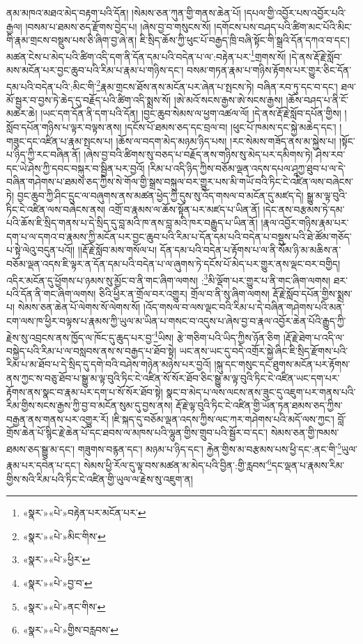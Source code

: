 ནམ་མཁའ་མཐའ་མེད་བརྟག་པའི་དོན། །སེམས་ཅན་ཀུན་གྱི་གནས་ཆེན་པོ། །དཔལ་གྱི་འབྱོར་པས་འབྱོར་པའི་རྒྱལ། །བསམ་པ་ཐམས་ཅད་རྫོགས་བྱེད་པ། །ཞེས་བྱ་བ་གསུངས་སོ། །དགོངས་པས་བཤད་པའི་ཚིག་མང་པོའི་མིང་གི་རྣམ་གྲངས་བསྡུས་པས་ཅི་ཞིག་བྱ་ཞེ་ན། ཇི་སྲིད་ཆོས་ཀྱི་ཕུང་པོ་བརྒྱད་ཁྲི་བཞི་སྟོང་གི་སྒྲའི་དོན་དཀའ་བ་དང་། མཚན་ངེས་པ་མེད་པའི་ཚིག་འདི་དག་ནི་དོན་དམ་པའི་བདེན་པ་ལ་:བརྟེན་པར་\footnote{«སྣར་»«པེ་»བརྟེན་པར་མངོན་པར་}གྲགས་སོ། །དེ་ནས་རྡོ་རྗེ་སློབ་མས་མངོན་པར་བྱང་ཆུབ་པའི་རིམ་པ་རྣམ་པ་གཉིས་དང་། བསམ་གཏན་རྣམ་པ་གཉིས་རྟོགས་པར་གྱུར་ཅིང་དོན་དམ་པའི་བདེན་པའི་:མིང་གི་\footnote{«སྣར་»«པེ་»མིང་གིས་}རྣམ་གྲངས་ཐོས་ནས་མངོན་པར་ཞེན་པ་སྤངས་ཏེ། བཞིན་རབ་ཏུ་དང་བ་དང་། ཐལ་མོ་སྦྱར་བ་བྱས་ཏེ་ཆེད་དུ་བརྗོད་པའི་ཚིག་འདི་སྨྲས་སོ། །ཨེ་མའོ་སངས་རྒྱས་ཨེ་སངས་རྒྱས། །ཆོས་བཤད་པ་ནི་ངོ་མཚར་ཆེ། །ཡང་དག་དོན་ནི་དག་པའི་དོན། །བྱང་ཆུབ་སེམས་ལ་ཕྱག་འཚལ་ལོ། །དེ་ནས་རྡོ་རྗེ་སློབ་དཔོན་གྱིས། །སློབ་དཔོན་གཉིས་པ་ལྟར་བལྟས་ནས། །དངོས་པོ་ཐམས་ཅད་དང་བྲལ་བ། །ཕུང་པོ་ཁམས་དང་སྐྱེ་མཆེད་དང་། །གཟུང་དང་འཛིན་པ་རྣམ་སྤངས་པ། །ཆོས་ལ་བདག་མེད་མཉམ་ཉིད་པས། །རང་སེམས་གཟོད་ནས་མ་སྐྱེས་པ། །སྟོང་པ་ཉིད་ཀྱི་རང་བཞིན་ནོ། །ཞེས་བྱ་བའི་ཚིགས་སུ་བཅད་པ་བརྗོད་ནས་གཉིས་སུ་མེད་པར་དམིགས་ཏེ། ཤེས་རབ་དང་ཡེ་ཤེས་ཀྱི་དབང་བསྐུར་བ་སྦྱིན་པར་བྱའོ། །རིམ་པ་འདི་ཉིད་ཀྱིས་བཅོམ་ལྡན་འདས་དཔལ་ཤཱཀྱ་ཐུབ་པ་ལ་དེ་བཞིན་གཤེགས་པ་ཐམས་ཅད་ཀྱིས་སེ་གོལ་གྱི་སྒྲས་བསྐུལ་བར་གྱུར་པས་མི་གཡོ་བའི་ཏིང་ངེ་འཛིན་ལས་བཞེངས་ཏེ། བྱང་ཆུབ་ཀྱི་ཤིང་དྲུང་ལ་བཞུགས་ནས་མཚན་ཕྱེད་ཀྱི་དུས་སུ་འོད་གསལ་བ་མངོན་དུ་མཛད་དེ། སྒྱུ་མ་ལྟ་བུའི་ཏིང་ངེ་འཛིན་ལས་བཞེངས་ནས། འགྲོ་བ་རྣམས་ལ་ཆོས་སྟོན་པར་མཛད་པ་ཡིན་ནོ། །དེང་ནས་བརྩམས་ཏེ་དམ་པའི་ཆོས་ཇི་སྲིད་གནས་པ་དེ་སྲིད་དུ་བླ་མའི་ཁ་ནས་བླ་མའི་ཁར་བརྒྱུད་པ་ཡིན་ནོ། །རྣལ་འབྱོར་གཉིས་རྣམ་པར་དག་པ་ལ་དགའ་བ་རྣམས་ཀྱི་མངོན་པར་བྱང་ཆུབ་པའི་རིམ་པ་དོན་དམ་པའི་བདེན་པ་བསྡུས་པའི་ཐེ་ཚོམ་གཅོད་པ་སྟེ་ལེའུ་བདུན་པའོ།། །།རྡོ་རྗེ་སློབ་མས་གསོལ་པ། དོན་དམ་པའི་བདེན་པ་རྟོགས་པ་ལ་ནི་སོམ་ཉི་མ་མཆིས་ན་བཅོམ་ལྡན་འདས་ཇི་ལྟར་ན་དོན་དམ་པའི་བདེན་པ་ལ་ཞུགས་ཏེ་དངོས་པོ་མེད་པར་གྱུར་ནས་ལྡང་བར་བགྱིད། འདིར་མངོན་དུ་ཕྱོགས་པ་ཉམས་སུ་མྱོང་བ་ནི་གང་ཞིག་ལགས། :\footnote{«སྣར་»«པེ་»ཕྱིར་}མི་ལྡོག་པར་གྱུར་པ་ནི་གང་ཞིག་ལགས། ཐར་པའི་དོན་ནི་གང་ཞིག་ལགས། ཅིའི་ཕྱིར་ན་གྲོལ་བར་འགྱུར། གྲོལ་བ་ནི་སུ་ཞིག་ལགས། རྡོ་རྗེ་སློབ་དཔོན་གྱིས་སྨྲས་པ། སེམས་ཅན་ཆེན་པོ་ལེགས་སོ་ལེགས་སོ། །འོད་གསལ་བ་ལས་ལྡང་བའི་རིམ་པ་དེ་བཞིན་གཤེགས་པའི་མན་ངག་ལས་ཁ་ཕྱིར་བལྟས་པ་རྣམས་ཀྱི་ཡུལ་མ་ཡིན་པ་གསང་བ་འདུས་པ་ཞེས་བྱ་བ་རྣལ་འབྱོར་ཆེན་པོའི་རྒྱུད་ཀྱི་རྗེས་སུ་འབྲངས་ནས་ཁྱོད་ལ་ཁོང་དུ་ཆུད་པར་བྱ་\footnote{«སྣར་»«པེ་»བྱ་བ་}ཡིས། རྩེ་གཅིག་པའི་ཡིད་ཀྱིས་ཉོན་ཅིག །རྡོ་རྗེ་ཐེག་པ་འདི་ལ་བསྐྱེད་པའི་རིམ་པ་ལ་བསླབས་ནས་ས་བརྒྱད་པ་ཐོབ་སྟེ། ཡང་ནས་ཡང་དུ་བདེ་འགྲོར་སྐྱེ་ཞིང་ཇི་སྲིད་རྫོགས་པའི་རིམ་པ་མ་ཐོབ་པ་དེ་སྲིད་དུ་དགེ་བའི་བཤེས་གཉེན་མཉེས་པར་བྱའོ། །སྐུ་དང་གསུང་དང་ཐུགས་མངོན་པར་རྟོགས་ནས་ཀྱང་ས་བཅུ་ཐོབ་པ་སྒྱུ་མ་ལྟ་བུའི་ཏིང་ངེ་འཛིན་སོ་སོར་ཐོབ་ཅིང་སྒྱུ་མ་ལྟ་བུའི་ཏིང་ངེ་འཛིན་ཡང་དག་པར་རྟོགས་ནས་སྣང་བ་རྣམ་པར་དག་པ་སོ་སོར་ཐོབ་སྟེ། སྣང་བ་མེད་པ་ལས་ལངས་ནས་ཟུང་དུ་འཇུག་པར་གནས་པའི་རིམ་གྱིས་སངས་རྒྱས་ཀྱི་བྱ་བ་མངོན་སུམ་དུ་བྱས་ནས། རྡོ་རྗེ་ལྟ་བུའི་ཏིང་ངེ་འཛིན་གྱི་ཡོན་ཏན་ཐམས་ཅད་ཀྱིས་བརྒྱན་ནས་གནས་པར་འགྱུར་རོ། །ཇི་སྐད་དུ་བཅོམ་ལྡན་འདས་ཀྱིས་ལང་ཀར་གཤེགས་པའི་མདོ་ལས་ཀྱང་། བློ་གྲོས་ཆེན་པོ་སྙིང་རྗེ་ཆེན་པོ་དང་ཐབས་ལ་མཁས་པའི་ལྷུན་གྱིས་གྲུབ་པའི་སྦྱོར་བ་དང་། སེམས་ཅན་གྱི་ཁམས་ཐམས་ཅད་སྒྱུ་མ་དང་། གཟུགས་བརྙན་དང་། མཉམ་པ་ཉིད་དང་། རྐྱེན་གྱིས་མ་བརྩམས་པས་ཕྱི་དང་:ནང་གི་\footnote{«སྣར་»«པེ་»ནང་གིས་}ཡུལ་རྣམ་པར་དབེན་པ་དང་། སེམས་ཕྱི་རོལ་དུ་ལྟ་བས་མཚན་མ་མེད་པའི་བྱིན་:གྱི་རླབས་\footnote{«སྣར་»«པེ་»གྱིས་བརླབས་}དང་ལྡན་པ་རྣམས་རིམ་གྱིས་སའི་རིམ་པའི་ཏིང་ངེ་འཛིན་གྱི་ཡུལ་ལ་རྗེས་སུ་འཇུག་ན། 